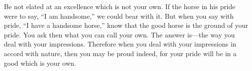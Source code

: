 Be not elated at an excellence which is not your own. If the horse in his pride
were to say,  ``I am handsome,'' we could  bear with it. But when  you say with
pride, ``I have a  handsome horse,'' know that the good horse  is the ground of
your pride. You  ask then what you  can call your own. The  answer is---the way
you deal with  your impressions. Therefore when you deal  with your impressions
in accord with nature, then you may be  proud indeed, for your pride will be in
a good which is your own.
